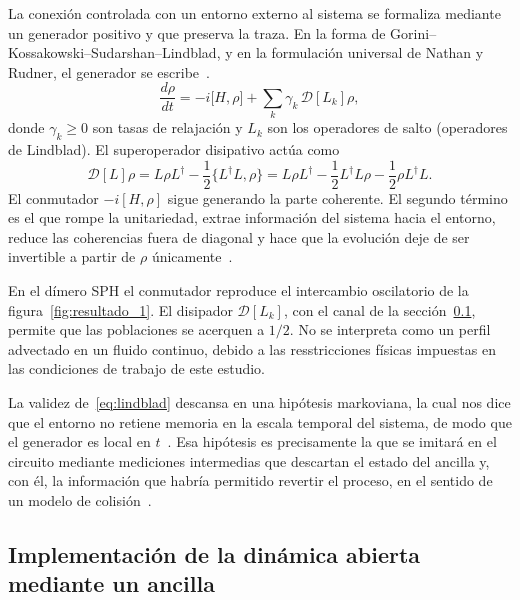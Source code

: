 La conexión controlada con un entorno externo al sistema se formaliza mediante un generador positivo y que preserva la traza. En la forma de Gorini--Kossakowski--Sudarshan--Lindblad, y en la formulación universal de Nathan y Rudner, el generador se escribe~\cite{Lindblad1976,Gorini1976,Nathan2020UniversalLindblad}.
\begin{equation}
  \frac{d\rho}{dt}=-i\bigl[H,\rho\bigr]
  +\sum_{k}\gamma_{k}\,\mathcal{D}[L_{k}]\rho,
  \label{eq:lindblad}
\end{equation}
donde $\gamma_{k}\ge 0$ son tasas de relajación y $L_{k}$ son los operadores de salto (operadores de Lindblad). El superoperador disipativo actúa como
\begin{equation}
  \mathcal{D}[L]\rho
  =L\rho L^{\dagger}
  -\frac12\bigl\{L^{\dagger}L,\rho\bigr\}
  =L\rho L^{\dagger}
  -\frac12 L^{\dagger}L\rho
  -\frac12\rho L^{\dagger}L.
  \label{eq:dissipator}
\end{equation}
El conmutador $-i[H,\rho]$ sigue generando la parte coherente. El segundo término es el que rompe la unitariedad, extrae información del sistema hacia el entorno, reduce las coherencias fuera de diagonal y hace que la evolución deje de ser invertible a partir de $\rho$ únicamente~\cite{Nathan2020UniversalLindblad,nielsen2010}.

En el dímero SPH el conmutador reproduce el intercambio oscilatorio de la figura~\ref{fig:resultado_1}. El disipador $\mathcal{D}[L_{k}]$, con el canal de la sección~\ref{sec:implementacion-ancilla}, permite que las poblaciones se acerquen a $1/2$. No se interpreta como un perfil advectado en un fluido continuo, debido a las resstricciones físicas impuestas en las condiciones de trabajo de este estudio.

La validez de~\eqref{eq:lindblad} descansa en una hipótesis markoviana, la cual nos dice que el entorno no retiene memoria en la escala temporal del sistema, de modo que el generador es local en $t$~\cite{Nathan2020UniversalLindblad}. Esa hipótesis es precisamente la que se imitará en el circuito mediante mediciones intermedias que descartan el estado del ancilla y, con él, la información que habría permitido revertir el proceso, en el sentido de un modelo de colisión~\cite{Ciccarello_2022}.

\subsection{Implementación de la dinámica abierta mediante un ancilla}
\label{sec:implementacion-ancilla}


